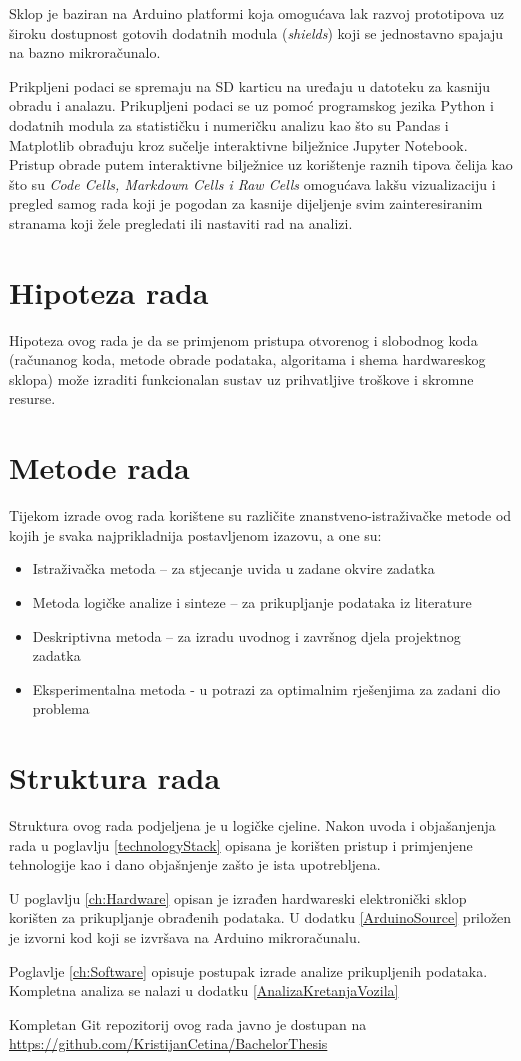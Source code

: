 Sklop je baziran na Arduino platformi koja omogućava lak razvoj prototipova uz široku dostupnost gotovih dodatnih modula (\textit{shields}) koji se jednostavno spajaju na bazno mikroračunalo.

Prikpljeni podaci se spremaju na SD karticu na uređaju u datoteku za kasniju obradu i analazu.
Prikupljeni podaci se uz pomoć programskog jezika Python i dodatnih modula za statističku i numeričku analizu kao što su Pandas i Matplotlib obrađuju kroz sučelje interaktivne bilježnice Jupyter Notebook.
Pristup obrade putem interaktivne bilježnice uz korištenje raznih tipova čelija kao što su \textit{Code Cells, Markdown Cells i Raw Cells} omogućava lakšu vizualizaciju i pregled samog rada koji je pogodan za kasnije dijeljenje svim zainteresiranim stranama koji žele pregledati ili nastaviti rad na analizi.

\section{Hipoteza rada}
Hipoteza ovog rada je da se primjenom pristupa otvorenog i slobodnog koda (računanog koda, metode obrade podataka, algoritama i shema hardwareskog sklopa) može izraditi funkcionalan sustav uz prihvatljive troškove i skromne resurse.

\section{Metode rada}
Tijekom izrade ovog rada korištene su različite znanstveno-istraživačke metode od kojih je svaka najprikladnija postavljenom izazovu, a one su:
\begin{itemize}
\item Istraživačka metoda – za stjecanje uvida u zadane okvire zadatka
\item Metoda logičke analize i sinteze – za prikupljanje podataka iz literature
\item Deskriptivna metoda – za izradu uvodnog i završnog djela projektnog zadatka
\item Eksperimentalna metoda - u potrazi za optimalnim rješenjima za zadani dio problema
\end{itemize}

\section{Struktura rada}
Struktura ovog rada podjeljena je u logičke cjeline.
Nakon uvoda i objašanjenja rada u poglavlju \ref{technologyStack} opisana je korišten pristup i primjenjene tehnologije kao i dano objašnjenje zašto je ista upotrebljena.

U poglavlju \ref{ch:Hardware} opisan je izrađen hardwareski elektronički sklop korišten za prikupljanje obrađenih podataka.
U dodatku \ref{ArduinoSource} priložen je izvorni kod koji se izvršava na Arduino mikroračunalu.

Poglavlje \ref{ch:Software} opisuje postupak izrade analize prikupljenih podataka.
Kompletna analiza se nalazi u dodatku \ref{AnalizaKretanjaVozila}

Kompletan Git repozitorij ovog rada javno je dostupan na \url{https://github.com/KristijanCetina/BachelorThesis}
